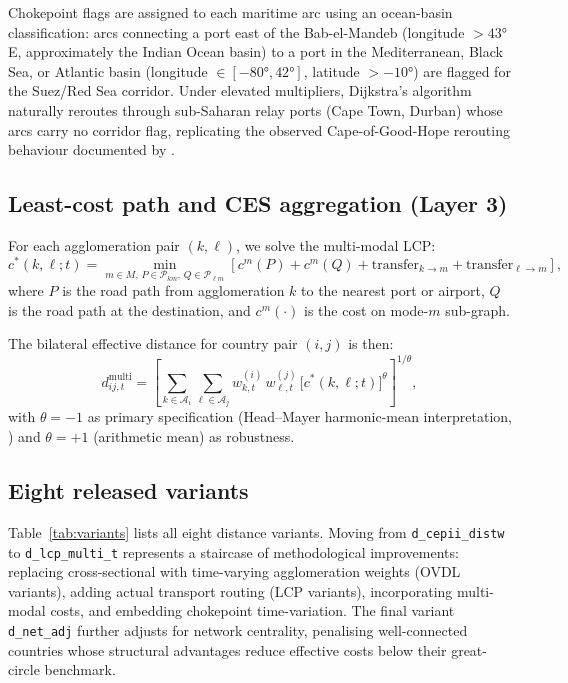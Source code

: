 \documentclass[11pt, a4paper]{article}
\begin{document}
Chokepoint flags are assigned to each maritime arc using an ocean-basin
classification: arcs connecting a port east of the Bab-el-Mandeb
(longitude $> 43°$E, approximately the Indian Ocean basin) to a port in
the Mediterranean, Black Sea, or Atlantic basin (longitude $\in [-80°, 42°]$,
latitude $> -10°$) are flagged for the Suez/Red Sea corridor.  Under
elevated multipliers, Dijkstra's algorithm naturally reroutes through
sub-Saharan relay ports (Cape Town, Durban) whose arcs carry no corridor flag,
replicating the observed Cape-of-Good-Hope rerouting behaviour documented
by \citet{verschuur_koks_hall_2021}.

\subsection{Least-cost path and CES aggregation (Layer 3)}
\label{sec:construction:lcp}

For each agglomeration pair $(k, \ell)$, we solve the multi-modal LCP:
\begin{equation}
  c^*(k,\ell;t) = \min_{m \in M,\, P \in \mathcal{P}_{km},\,
  Q \in \mathcal{P}_{\ell m}} \left[ c^m(P) + c^m(Q) +
  \text{transfer}_{k\to m} + \text{transfer}_{\ell\to m} \right],
\label{eq:lcp}
\end{equation}
where $P$ is the road path from agglomeration $k$ to the nearest port or
airport, $Q$ is the road path at the destination, and
$c^m(\cdot)$ is the cost on mode-$m$ sub-graph.

The bilateral effective distance for country pair $(i,j)$ is then:
\begin{equation}
  d^{\text{multi}}_{ij,t} = \left[ \sum_{k \in \mathcal{A}_i}
  \sum_{\ell \in \mathcal{A}_j} w^{(i)}_{k,t}\, w^{(j)}_{\ell,t}\,
  \bigl[c^*(k,\ell;t)\bigr]^{\theta} \right]^{1/\theta},
\label{eq:dmulti}
\end{equation}
with $\theta = -1$ as primary specification (Head--Mayer harmonic-mean
interpretation, \citealp{head_mayer_2002}) and $\theta = +1$
(arithmetic mean) as robustness.

\subsection{Eight released variants}
\label{sec:construction:variants}

Table~\ref{tab:variants} lists all eight distance variants.  Moving from
\texttt{d\_cepii\_distw} to \texttt{d\_lcp\_multi\_t} represents a
staircase of methodological improvements: replacing cross-sectional with
time-varying agglomeration weights (OVDL variants), adding actual transport
routing (LCP variants), incorporating multi-modal costs, and embedding
chokepoint time-variation.  The final variant \texttt{d\_net\_adj} further
adjusts for network centrality, penalising well-connected countries whose
structural advantages reduce effective costs below their great-circle
benchmark.
\end{document}
